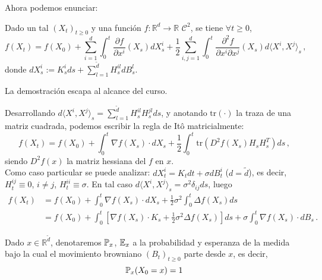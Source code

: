 \newp Ahora podemos enunciar: 
\begin{theorem}
Dado un tal $(X_t)_{t \ge 0}$  y una función $f: \mathbb{R}^d \to \mathbb{R}$ $\mathcal{C}^2$, se tiene $\forall t \ge 0$, 
\begin{equation*}
    \label{eq:sde_8}
    f(X_t) = f(X_0) + \sum_{i=1}^{d} \int_{0}^{t} \frac{\partial f}{\partial x^i} (X_s) dX_s^i + \frac{1}{2} \sum_{i,j = 1}^{d} \int_{0}^{t} \frac{\partial^2 f}{\partial x^i \partial x^j}(X_s) d \langle X^i, X^j \rangle _s \,,
\end{equation*}
donde $dX_s^i := K_s^i ds + \sum_{l=1}^{\tilde{d}} H_{s}^{il} dB_s^l$.
\end{theorem}

La demostración escapa al alcance del curso. 

\newp Desarrollando $d \langle X^i, X^j \rangle _s = \sum_{l=1}^{\tilde{d}} H_{s}^{il} H_{s}^{jl} ds$, y anotando $\text{tr}(\cdot)$ la traza de una matriz cuadrada, podemos escribir la regla de Itô matricialmente: 
\begin{equation*}
    f(X_t) = f(X_0) + \int_{0}^{t} \nabla f(X_s) \cdot dX_s + \frac{1}{2} \int_{0}^{t} \text{tr} \left( D^2 f(X_s) H_s H_s^{T} \right) ds \,,
\end{equation*}
siendo $D^2 f(x)$ la matriz hessiana del $f$ en $x$. 
\\ Como caso particular se puede analizar: $dX_t^i = K_t dt + \sigma dB_t^i$ ($d = \tilde{d}$), es decir, $H_t^{ij} \equiv 0$, $i \neq j$, 
$H_t^{ii} \equiv \sigma$. En tal caso $d \langle X^i, X^j \rangle _s = \sigma^2 \delta_{ij} ds$, luego 
\begin{align*}
    f(X_t) & = f(X_0) + \int_{0}^{t} \nabla f(X_s) \cdot d X_s + \frac{1}{2} \sigma^2 \int_0^{t} \Delta f(X_s) ds \\ 
    & = f(X_0) + \int_{0}^{t} \left[ \nabla f(X_s) \cdot K_s + \frac{1}{2} \sigma^2 \Delta f(X_s) \right] ds + \sigma \int_{0}^{t} \nabla f(X_s) \cdot dB_s \,.
\end{align*}

\begin{definition}
Dado $x \in \mathbb{R}^{\tilde{d}}$, denotaremos $\P_x$, $\E_x$ a la probabilidad y esperanza de la medida bajo la cual el movimiento browniano $(B_t)_{t \ge 0}$ parte desde $x$, es decir, 
\begin{equation*}
    \P_x (X_0 = x) = 1
\end{equation*}
\end{definition}

